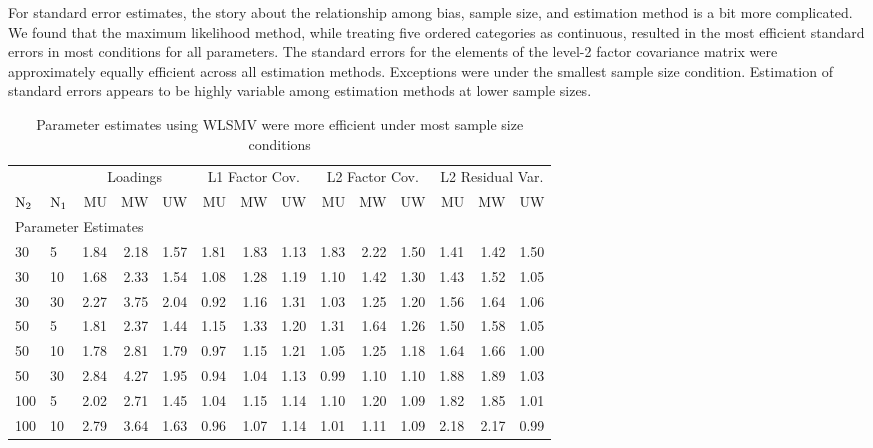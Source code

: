 \documentclass[Review,sageh,times, doublespace]{sagej}
\begin{document}
For standard error estimates, the story about the relationship among bias, sample size, and estimation method is a bit more complicated.
We found that the maximum likelihood method, while treating five ordered categories as continuous, resulted in the most efficient standard errors in most conditions for all parameters.
The standard errors for the elements of the level-2 factor covariance matrix were approximately equally efficient across all estimation methods.
Exceptions were under the smallest sample size condition.
Estimation of standard errors appears to be highly variable among estimation methods at lower sample sizes.
\begin{table}[!htp]
 \centering
 \small
 \begin{threeparttable}
\caption{Parameter estimates using WLSMV were more efficient under most sample size conditions} 
\label{tb:re}
\begin{tabular}{llrrrrrrrrrrrr}
  \toprule
  &     & \multicolumn{3}{c}{Loadings} & \multicolumn{3}{c}{L1 Factor Cov.} & \multicolumn{3}{c}{L2 Factor Cov.} & \multicolumn{3}{c}{L2 Residual Var.}\\  \cmidrule(lr){3-5} \cmidrule(lr){6-8} \cmidrule(lr){9-11} \cmidrule(lr){12-14}
$\rm N_2$ & $\rm N_1$ & MU & MW & UW & MU & MW & UW & MU & MW & UW & MU & MW & UW \\ 
  \midrule
\multicolumn{14}{l}{Parameter Estimates}\\
30 & 5 & 1.84 & 2.18 & 1.57 & 1.81 & 1.83 & 1.13 & 1.83 & 2.22 & 1.50 & 1.41 & 1.42 & 1.50 \\ 
  30 & 10 & 1.68 & 2.33 & 1.54 & 1.08 & 1.28 & 1.19 & 1.10 & 1.42 & 1.30 & 1.43 & 1.52 & 1.05 \\ 
  30 & 30 & 2.27 & 3.75 & 2.04 & 0.92 & 1.16 & 1.31 & 1.03 & 1.25 & 1.20 & 1.56 & 1.64 & 1.06 \\ 
  50 & 5 & 1.81 & 2.37 & 1.44 & 1.15 & 1.33 & 1.20 & 1.31 & 1.64 & 1.26 & 1.50 & 1.58 & 1.05 \\ 
  50 & 10 & 1.78 & 2.81 & 1.79 & 0.97 & 1.15 & 1.21 & 1.05 & 1.25 & 1.18 & 1.64 & 1.66 & 1.00 \\ 
  50 & 30 & 2.84 & 4.27 & 1.95 & 0.94 & 1.04 & 1.13 & 0.99 & 1.10 & 1.10 & 1.88 & 1.89 & 1.03 \\ 
  100 & 5 & 2.02 & 2.71 & 1.45 & 1.04 & 1.15 & 1.14 & 1.10 & 1.20 & 1.09 & 1.82 & 1.85 & 1.01 \\ 
  100 & 10 & 2.79 & 3.64 & 1.63 & 0.96 & 1.07 & 1.14 & 1.01 & 1.11 & 1.09 & 2.18 & 2.17 & 0.99 \\ 

\end{tabular}
\end{threeparttable}
\end{table}
\end{document}
